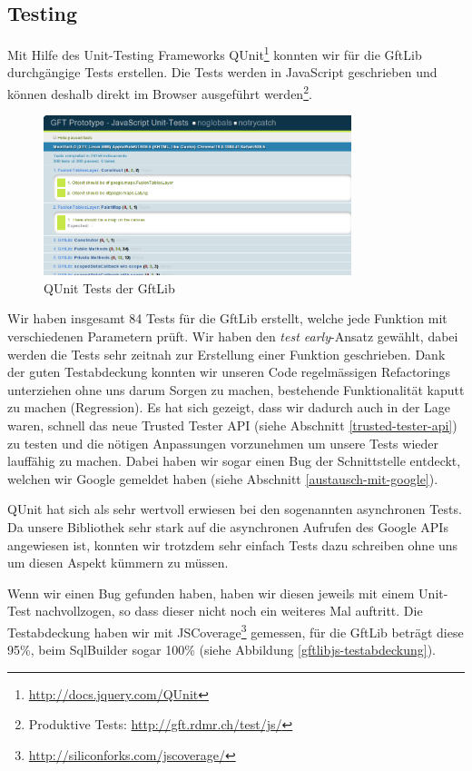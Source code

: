 \subsection{Testing}
\label{gftlib-testing}
Mit Hilfe des Unit-Testing Frameworks QUnit\footnote{\url{http://docs.jquery.com/QUnit}} konnten wir für die GftLib durchgängige Tests erstellen. Die Tests werden in JavaScript geschrieben und können deshalb direkt im Browser ausgeführt werden\footnote{Produktive Tests: \url{http://gft.rdmr.ch/test/js/}}. 

\begin{figure}[!ht]
	\centering
	\includegraphics[width=0.8\textwidth]{images/gftlib-js/gftlibjs-tests}
	\caption{QUnit Tests der GftLib}
	\label{gftlibjs-tests}
\end{figure}

Wir haben insgesamt 84 Tests für die GftLib erstellt, welche jede Funktion mit verschiedenen Parametern prüft. Wir haben den \emph{test early}-Ansatz gewählt, dabei werden die Tests sehr zeitnah zur Erstellung einer Funktion geschrieben. Dank der guten Testabdeckung konnten wir unseren Code regelmässigen Refactorings unterziehen ohne uns darum Sorgen zu machen, bestehende Funktionalität kaputt zu machen (Regression). Es hat sich gezeigt, dass wir dadurch auch in der Lage waren, schnell das neue Trusted Tester \gls{API} (siehe Abschnitt \ref{trusted-tester-api}) zu testen und die nötigen Anpassungen vorzunehmen um unsere Tests wieder lauffähig zu machen. Dabei haben wir sogar einen Bug der Schnittstelle entdeckt, welchen wir Google gemeldet haben (siehe Abschnitt \ref{austausch-mit-google}).

QUnit hat sich als sehr wertvoll erwiesen bei den sogenannten asynchronen Tests. Da unsere Bibliothek sehr stark auf die asynchronen Aufrufen des Google \gls{API}s angewiesen ist, konnten wir trotzdem sehr einfach Tests dazu schreiben ohne uns um diesen Aspekt kümmern zu müssen.

Wenn wir einen Bug gefunden haben, haben wir diesen jeweils mit einem Unit-Test nachvollzogen, so dass dieser nicht noch ein weiteres Mal auftritt. Die Testabdeckung haben wir mit JSCoverage\footnote{\url{http://siliconforks.com/jscoverage/}} gemessen, für die GftLib beträgt diese 95\%, beim SqlBuilder sogar 100\% (siehe Abbildung \ref{gftlibjs-testabdeckung}).

